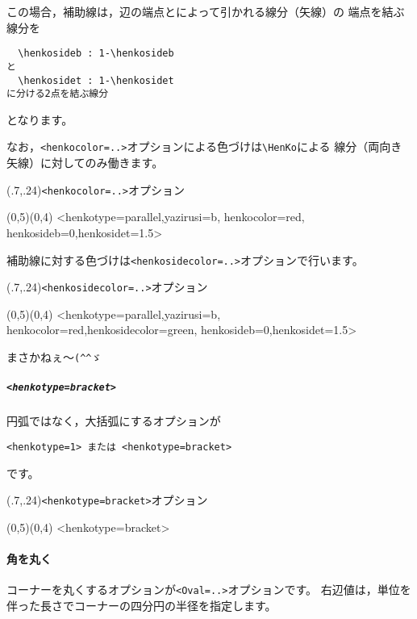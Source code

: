 この場合，補助線は，辺の端点とによって引かれる線分（矢線）の
端点を結ぶ線分を
\begin{jquote}
\begin{verbatim}
  \henkosideb : 1-\henkosideb
と
  \henkosidet : 1-\henkosidet
に分ける2点を結ぶ線分
\end{verbatim}
\end{jquote}
となります。

なお，\verb+<henkocolor=..>+オプションによる色づけは\verb+\HenKo+による
線分（両向き矢線）に対してのみ働きます。

\begin{showEx}(.7,.24){\texttt{<henkocolor=..>}オプション}
\begin{zahyou*}[ul=6mm](0,5)(0,4)
  \Hasen{\A\B}
  \HenKo<henkotype=parallel,yazirusi=b,%
    henkocolor=red,%
    henkosideb=0,henkosidet=1.5>\A{}
\end{zahyou*}
\end{showEx}

補助線に対する色づけは\verb+<henkosidecolor=..>+オプションで行います。

\begin{showEx}(.7,.24){\texttt{<henkosidecolor=..>}オプション}
\begin{zahyou*}[ul=6mm](0,5)(0,4)
  \Hasen{\A\B}
  \HenKo<henkotype=parallel,yazirusi=b,%
    henkocolor=red,henkosidecolor=green,%
    henkosideb=0,henkosidet=1.5>\A{}
\end{zahyou*}
\end{showEx}

まさかねぇ〜\verb+(^^ゞ+

\subparagraph{\texttt{<henkotype=bracket>}}
円弧ではなく，大括弧にするオプションが
\begin{jquote}
\begin{verbatim}
<henkotype=1> または <henkotype=bracket>
\end{verbatim}
\end{jquote}
です。

\begin{showEx}(.7,.24){\texttt{<henkotype=bracket>}オプション}
\begin{zahyou*}[ul=6mm](0,5)(0,4)
  \Hasen{\A\B}
  \HenKo<henkotype=bracket>\A{}
\end{zahyou*}
\end{showEx}

\paragraph{角を丸く}
コーナーを丸くするオプションが\verb+<Oval=..>+オプションです。
右辺値は，単位を伴った長さでコーナーの四分円の半径を指定します。

